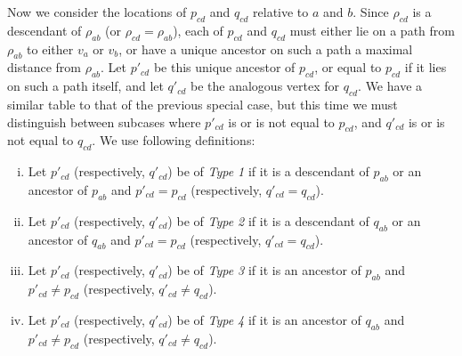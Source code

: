 \documentclass[11pt]{amsart}
\begin{document}
Now we consider the locations of $p_{cd}$ and $q_{cd}$ relative to $a$ and $b$. Since $\rho_{cd}$ is a descendant of $\rho_{ab}$ (or $\rho_{cd}=\rho_{ab}$), each of $p_{cd}$ and $q_{cd}$ must either lie on a path from $\rho_{ab}$ to either $v_a$ or $v_b$, or have a unique ancestor on such a path a maximal distance from $\rho_{ab}$. Let $p'_{cd}$ be this unique ancestor of $p_{cd}$, or equal to $p_{cd}$ if it lies on such a path itself, and let $q'_{cd}$ be the analogous vertex for $q_{cd}$. We have a similar table to that of the previous special case, but this time we must distinguish between subcases where $p'_{cd}$ is or is not equal to $p_{cd}$, and $q'_{cd}$ is or is not equal to $q_{cd}$. We use following definitions:
\begin{enumerate}[(i)]
\item Let $p'_{cd}$ (respectively, $q'_{cd}$) be of {\em Type 1} if it is a descendant of $p_{ab}$ or an ancestor of $p_{ab}$ and $p'_{cd}=p_{cd}$ (respectively, $q'_{cd}= q_{cd}$).

\item Let $p'_{cd}$ (respectively, $q'_{cd}$) be of {\em Type 2} if it is a descendant of $q_{ab}$ or an ancestor of $q_{ab}$ and $p'_{cd}=p_{cd}$ (respectively, $q'_{cd}= q_{cd}$).

\item Let $p'_{cd}$ (respectively, $q'_{cd}$) be of {\em Type 3} if it is an ancestor of $p_{ab}$ and $p'_{cd}\neq p_{cd}$ (respectively, $q'_{cd}\neq q_{cd}$).

\item Let $p'_{cd}$ (respectively, $q'_{cd}$) be of {\em Type 4} if it is an ancestor of $q_{ab}$ and $p'_{cd}\neq p_{cd}$ (respectively, $q'_{cd}\neq q_{cd}$).
\end{enumerate}
\end{document}
